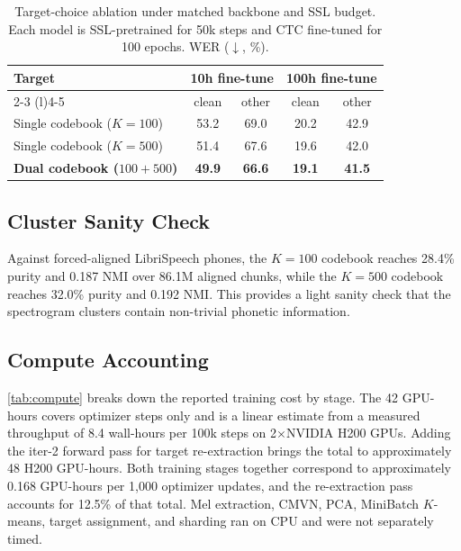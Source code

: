 \documentclass{article}
\begin{document}
\begin{table}[t]
  \caption{Target-choice ablation under matched backbone and SSL budget.
    Each model is SSL-pretrained for 50k steps and CTC fine-tuned for 100
    epochs. WER ($\downarrow$, \%).}
  \label{tab:abl-codebook}
  \centering
  \small
  \setlength{\tabcolsep}{2.8pt}
  \renewcommand{\arraystretch}{1.08}
  \begin{tabular}{@{}lcccc@{}}
    \toprule
    Target & \multicolumn{2}{c}{10h fine-tune} & \multicolumn{2}{c}{100h fine-tune} \\
    \cmidrule(lr){2-3} \cmidrule(l){4-5}
      & clean & other & clean & other \\
    \midrule
    Single codebook ($K{=}100$) & 53.2 & 69.0 & 20.2 & 42.9 \\
    Single codebook ($K{=}500$) & 51.4 & 67.6 & 19.6 & 42.0 \\
    \addlinespace[1pt]
    \textbf{Dual codebook ($100{+}500$)} & \textbf{49.9} & \textbf{66.6} & \textbf{19.1} & \textbf{41.5} \\
    \bottomrule
  \end{tabular}
  \vskip -0.1in
\end{table}

\subsection{Cluster Sanity Check}
Against forced-aligned LibriSpeech phones, the $K{=}100$ codebook reaches
28.4\% purity and 0.187 NMI over 86.1M aligned chunks, while the
$K{=}500$ codebook reaches 32.0\% purity and 0.192 NMI. This provides a
light sanity check that the spectrogram clusters contain non-trivial
phonetic information.

\subsection{Compute Accounting}
\label{sec:compute}

\cref{tab:compute} breaks down the reported training cost by stage.
The 42 GPU-hours covers optimizer steps only and is a linear estimate
from a measured throughput of 8.4 wall-hours per 100k steps on
2$\times$NVIDIA H200 GPUs. Adding the iter-2 forward pass for target
re-extraction brings the total to approximately 48 H200 GPU-hours.
Both training stages together correspond to approximately 0.168
GPU-hours per 1,000 optimizer updates, and the re-extraction pass
accounts for 12.5\% of that total. Mel extraction, CMVN, PCA,
MiniBatch $K$-means, target assignment, and sharding ran on CPU and
were not separately timed.
\end{document}
